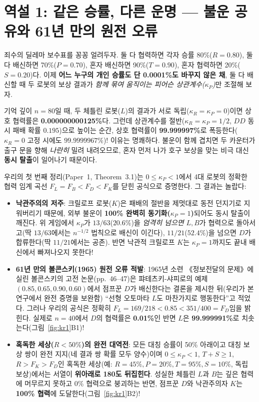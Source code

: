 \documentclass[11pt,a4paper]{article}
\begin{document}
\section{역설 1: 같은 승률, 다른 운명 --- 불운 공유와 61년 만의 원전 오류}

죄수의 딜레마 보수표를 꽁꽁 얼려두자. 둘 다 협력하면 각자 승률 80\%($R=0.80$), 둘 다 배신하면 70\%($P=0.70$), 혼자 배신하면 90\%($T=0.90$), 혼자 협력하면 20\%($S=0.20$)다. 이제 \textbf{어느 누구의 개인 승률도 단 0.0001\%도 바꾸지 않은 채}, 둘 다 배신할 때 두 로봇의 보상 결과가 \emph{함께 묶여 움직이는 피어슨 상관계수($\kappa_P$)}만 조절해 보자.

기억 깊이 $n=80$일 때, 두 체틀린 로봇($L$)의 결과가 서로 독립($\kappa_R=\kappa_P=0$)이면 상호 협력률은 \textbf{0.000000000125\%}다. 그런데 상관계수를 절반($\kappa_R=\kappa_P=1/2$, $DD$ 동시 패배 확률 $0.195$)으로 높이는 순간, 상호 협력률이 \textbf{99.999997\%}로 폭등한다($\kappa_R=0$ 고정 시에도 $99.9999967\%$)! 이유는 명쾌하다. 불운이 함께 겹치면 두 카운터가 출구 문을 향해 \emph{나란히} 밀려 내려오므로, 혼자 먼저 나가 호구 보상을 맞는 비극 대신 \textbf{동시 탈출}이 일어나기 때문이다.

우리의 첫 번째 정리(Paper~1, Theorem~3.1)는 $0 \le \kappa_P < 1$에서 4대 로봇의 정확한 협력 임계 곡선 $F_L = F_B < F_D < F_K$를 닫힌 공식으로 증명한다. 그 결과는 놀랍다:
\begin{itemize}
  \item \textbf{낙관주의의 저주}: 크릴로프 로봇($K$)은 패배의 절반을 제멋대로 동전 던지기로 지워버리기 때문에, 외부 불운이 \textbf{100\% 완벽히 동기화($\kappa_P=1$)}되어도 동시 탈출이 깨진다. 위 게임에서 $\kappa_P$가 $13/63$($20.6\%$)을 \emph{엄격히 넘으면} $L,B$가 협력으로 돌아서고(딱 $13/63$에서는 $n^{-1/2}$ 법칙으로 배신이 이긴다), $11/21$($52.4\%$)을 넘으면 $D$가 합류한다(딱 $11/21$에서는 공존). 반면 낙관적 크릴로프 $K$는 $\kappa_P=1$까지도 끝내 배신에서 빠져나오지 못한다!
  \item \textbf{61년 만의 볼콘스키(1965) 원전 오류 적발}: 1965년 소련 《정보전달의 문제》에 실린 볼콘스키의 고전 논문(pp.~46--47)은 퍄테츠키-샤피로의 예제 $(0.85, 0.65, 0.90, 0.60)$에서 점프꾼 $D$가 배신한다는 결론을 제시한 뒤(우리가 본 연구에서 완전 증명을 보완함) ``선형 오토마타 $L$도 마찬가지로 행동한다''고 적었다. 그러나 우리의 공식은 정확히 $F_L = 169/218 < 0.85 < 351/400 = F_D$임을 밝힌다. 실제로 $n=40$에서 $D$의 협력률은 \textbf{0.01\%}인 반면 $L$은 \textbf{99.999991\%}로 치솟는다(그림~\ref{fig:kr1}B1)!
  \item \textbf{혹독한 세상($R < 50\%$)의 완전 대역전}: 모든 대칭 승률이 50\% 아래이고 대칭 보상 쌍이 완전 지지(네 결과 쌍 확률 모두 양수)이며 $0 \le \kappa_P < 1$, $T+S \ge 1$, $R > F_K > F_D$인 혹독한 세상(예: $R=45\%, P=20\%, T=95\%, S=10\%$, 독립 보상)에서는 서열이 \textbf{위아래로 180도 뒤집힌다}. 성실한 체틀린 $L$과 $B$는 깊은 협력에 머무르지 못하고 0\% 협력으로 붕괴하는 반면, 점프꾼 $D$와 낙관주의자 $K$는 \textbf{100\% 협력}에 도달한다(그림~\ref{fig:kr1}B2)!
\end{itemize}
\end{document}
